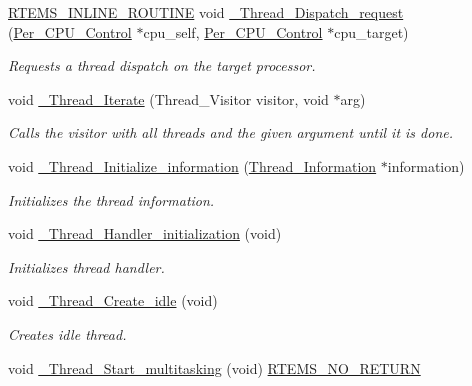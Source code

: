 \begin{DoxyCompactItemize}
\mbox{\hyperlink{group__RTEMSScoreBaseDefs_gac216239df231d5dbd15e3520b0b9313f}{R\+T\+E\+M\+S\+\_\+\+I\+N\+L\+I\+N\+E\+\_\+\+R\+O\+U\+T\+I\+NE}} void \mbox{\hyperlink{group__RTEMSScoreThread_ga216a6330c178a36afc4eb50a4a66ba4a}{\+\_\+\+Thread\+\_\+\+Dispatch\+\_\+request}} (\mbox{\hyperlink{structPer__CPU__Control}{Per\+\_\+\+C\+P\+U\+\_\+\+Control}} $\ast$cpu\+\_\+self, \mbox{\hyperlink{structPer__CPU__Control}{Per\+\_\+\+C\+P\+U\+\_\+\+Control}} $\ast$cpu\+\_\+target)
\begin{DoxyCompactList}\small\item\em Requests a thread dispatch on the target processor. \end{DoxyCompactList}\item 
void \mbox{\hyperlink{group__RTEMSScoreThread_gaccf2d81d16187ed8808e76addc8da0ed}{\+\_\+\+Thread\+\_\+\+Iterate}} (Thread\+\_\+\+Visitor visitor, void $\ast$arg)
\begin{DoxyCompactList}\small\item\em Calls the visitor with all threads and the given argument until it is done. \end{DoxyCompactList}\item 
void \mbox{\hyperlink{group__RTEMSScoreThread_gacd86ef6b0e5fb19ec14d7fe51e3868e2}{\+\_\+\+Thread\+\_\+\+Initialize\+\_\+information}} (\mbox{\hyperlink{structThread__Information}{Thread\+\_\+\+Information}} $\ast$information)
\begin{DoxyCompactList}\small\item\em Initializes the thread information. \end{DoxyCompactList}\item 
void \mbox{\hyperlink{group__RTEMSScoreThread_ga439268e164b067a866d2901085c8c672}{\+\_\+\+Thread\+\_\+\+Handler\+\_\+initialization}} (void)
\begin{DoxyCompactList}\small\item\em Initializes thread handler. \end{DoxyCompactList}\item 
void \mbox{\hyperlink{group__RTEMSScoreThread_ga86a9db1abab176f3d74f4f46a423c2c3}{\+\_\+\+Thread\+\_\+\+Create\+\_\+idle}} (void)
\begin{DoxyCompactList}\small\item\em Creates idle thread. \end{DoxyCompactList}\item 
void \mbox{\hyperlink{group__RTEMSScoreThread_gab27215302814d0aa0ec3306b165ea247}{\+\_\+\+Thread\+\_\+\+Start\+\_\+multitasking}} (void) \mbox{\hyperlink{group__RTEMSScoreBaseDefs_gaa2f0ed67aa174f684bb31b7e8bdb386f}{R\+T\+E\+M\+S\+\_\+\+N\+O\+\_\+\+R\+E\+T\+U\+RN}}

\end{DoxyCompactItemize}
